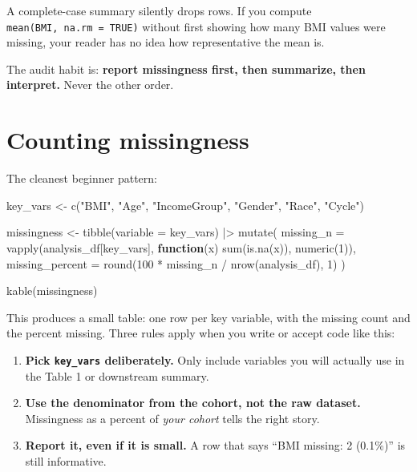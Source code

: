 \documentclass[
  letterpaper,
  DIV=11,
  numbers=noendperiod,
  oneside]{scrreprt}
\newenvironment{Shaded}{\begin{snugshade}}{\end{snugshade}}
\newcommand{\AttributeTok}[1]{\textcolor[rgb]{0.40,0.45,0.13}{#1}}
\newcommand{\ControlFlowTok}[1]{\textcolor[rgb]{0.00,0.23,0.31}{\textbf{#1}}}
\newcommand{\DecValTok}[1]{\textcolor[rgb]{0.68,0.00,0.00}{#1}}
\newcommand{\FunctionTok}[1]{\textcolor[rgb]{0.28,0.35,0.67}{#1}}
\newcommand{\NormalTok}[1]{\textcolor[rgb]{0.00,0.23,0.31}{#1}}
\newcommand{\OtherTok}[1]{\textcolor[rgb]{0.00,0.23,0.31}{#1}}
\newcommand{\SpecialCharTok}[1]{\textcolor[rgb]{0.37,0.37,0.37}{#1}}
\newcommand{\StringTok}[1]{\textcolor[rgb]{0.13,0.47,0.30}{#1}}
\providecommand{\tightlist}{%
  \setlength{\itemsep}{0pt}\setlength{\parskip}{0pt}}
\begin{document}
A complete-case summary silently drops rows. If you compute
\texttt{mean(BMI,\ na.rm\ =\ TRUE)} without first showing how many BMI
values were missing, your reader has no idea how representative the mean
is.

The audit habit is: \textbf{report missingness first, then summarize,
then interpret.} Never the other order.

\section*{Counting missingness}\label{counting-missingness}


The cleanest beginner pattern:

\begin{Shaded}
\begin{Highlighting}[numbers=left,,]
\NormalTok{key\_vars }\OtherTok{\textless{}{-}} \FunctionTok{c}\NormalTok{(}\StringTok{"BMI"}\NormalTok{, }\StringTok{"Age"}\NormalTok{, }\StringTok{"IncomeGroup"}\NormalTok{, }\StringTok{"Gender"}\NormalTok{, }\StringTok{"Race"}\NormalTok{, }\StringTok{"Cycle"}\NormalTok{)}

\NormalTok{missingness }\OtherTok{\textless{}{-}} \FunctionTok{tibble}\NormalTok{(}\AttributeTok{variable =}\NormalTok{ key\_vars) }\SpecialCharTok{|\textgreater{}}
  \FunctionTok{mutate}\NormalTok{(}
    \AttributeTok{missing\_n =} \FunctionTok{vapply}\NormalTok{(analysis\_df[key\_vars], }\ControlFlowTok{function}\NormalTok{(x) }\FunctionTok{sum}\NormalTok{(}\FunctionTok{is.na}\NormalTok{(x)), }\FunctionTok{numeric}\NormalTok{(}\DecValTok{1}\NormalTok{)),}
    \AttributeTok{missing\_percent =} \FunctionTok{round}\NormalTok{(}\DecValTok{100} \SpecialCharTok{*}\NormalTok{ missing\_n }\SpecialCharTok{/} \FunctionTok{nrow}\NormalTok{(analysis\_df), }\DecValTok{1}\NormalTok{)}
\NormalTok{  )}

\FunctionTok{kable}\NormalTok{(missingness)}
\end{Highlighting}
\end{Shaded}

This produces a small table: one row per key variable, with the missing
count and the percent missing. Three rules apply when you write or
accept code like this:

\begin{enumerate}
\def\labelenumi{\arabic{enumi}.}
\tightlist
\item
  \textbf{Pick \texttt{key\_vars} deliberately.} Only include variables
  you will actually use in the Table 1 or downstream summary.
\item
  \textbf{Use the denominator from the cohort, not the raw dataset.}
  Missingness as a percent of \emph{your cohort} tells the right story.
\item
  \textbf{Report it, even if it is small.} A row that says ``BMI
  missing: 2 (0.1\%)'' is still informative.
\end{enumerate}
\end{document}
